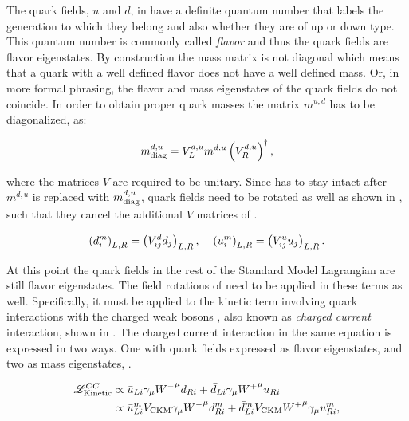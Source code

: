 The quark fields, $u$ and $d$,  in  have a definite quantum number that labels the generation to which they belong
and also whether they are of up or down type. This quantum number is commonly called {\it flavor} and thus the quark fields
are flavor eigenstates. By construction the mass matrix is not diagonal which means that
a quark with a well defined flavor does not have a well defined mass. Or, in more formal phrasing,
the flavor and mass eigenstates of the quark fields do not coincide. In order to obtain proper quark
masses the matrix $m^{u,d}$ has to be diagonalized, as:

\begin{equation}
  \centering
  m^{d,u}_{\rm diag} = V_L^{d,u} m^{d,u} \left(V_R^{d,u}\right)^{\dagger},
  \label{diagM}
\end{equation}

\noindent where the matrices $V$ are required to be unitary. Since  has to stay intact after $m^{d,u}$ is replaced with
$m^{d,u}_{\rm diag}$, quark fields need to be rotated as well as shown in , such that they cancel the additional $V$ matrices
of .

\begin{equation}
  \centering
  \left( d_{i}^m \right)_{L,R} = \left( V^d_{ij} d_{j} \right)_{L,R}, \;\;\;\; \left( u_{i}^m \right)_{L,R} = \left( V^u_{ij} u_{j} \right)_{L,R}.
  \label{quark_rotation}
\end{equation}

\noindent At this point the quark fields in the rest of the Standard Model Lagrangian are still flavor eigenstates.
The field rotations of  need to be applied in these terms as well. Specifically, it must be
applied to the kinetic term involving quark interactions with the charged weak bosons \Wpm, also known as {\it charged current}
interaction, shown in . The charged current interaction in the same equation is expressed in two ways.
One with quark fields expressed as flavor eigenstates,  and two as mass eigenstates, .

\begin{subequations}
  \centering
  \begin{align}
    \mathscr{L}_{\text{Kinetic}}^{CC} & \propto \bar{u}_{Li} \gamma_\mu {\Wm}^\mu d_{Ri} + \bar{d}_{Li} \gamma_\mu {\Wp}^\mu u_{Ri}  \label{CClagrangianInt} \\
                                      & \propto \bar{u}_{Li}^m  {V_{\text{CKM}}} \gamma_\mu {\Wm}^\mu d_{Ri}^m + \bar{d}_{Li}^m V_{\text{CKM}} {\Wp}^\mu \gamma_\mu u_{Ri}^m, \label{CClagrangianMass}
  \end{align}
  \label{CClagrangian}
\end{subequations}

